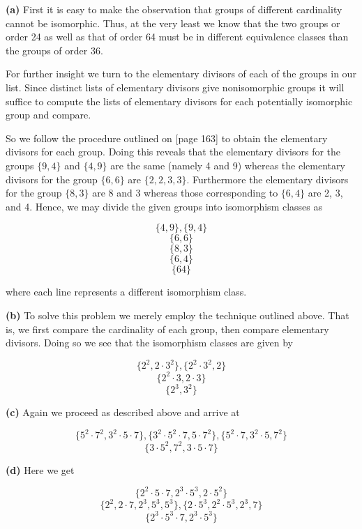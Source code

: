 \documentclass[12pt]{article}
\begin{document}
\textbf{(a)} First it is easy to make the observation that groups of different cardinality cannot be isomorphic. Thus, at the very least we know that the two groups or order 24 as well as that of order 64 must be in different equivalence classes than the groups of order 36.

For further insight we turn to the elementary divisors of each of the groups in our list. Since distinct lists of elementary divisors give nonisomorphic groups it will suffice to compute the lists of elementary divisors for each potentially isomorphic group and compare.


So we follow the procedure outlined on [page 163] to obtain the elementary divisors for each group. Doing this reveals that the elementary divisors for the groups $\{9,4\}$ and $\{4,9\}$ are the same (namely 4 and 9) whereas the elementary divisors for the group $\{6,6\}$ are $\{2,2,3,3\}$. Furthermore the elementary divisors for the group $\{8,3\}$ are 8 and 3 whereas those corresponding to $\{6,4\}$ are 2, 3, and 4. Hence, we may divide the given groups into isomorphism classes as 

\[\{4,9\}, \{9,4\}\]
\[\{6,6\}\]
\[\{8,3\}\]
\[\{6,4\}\]
\[\{64\}\]

where each line represents a different isomorphism class.

\textbf{(b)} To solve this problem we merely employ the technique outlined above. That is, we first compare the cardinality of each group, then compare elementary divisors. Doing so we see that the isomorphism classes are given by

\[\{2^2,2 \cdot 3^2\},\{2^2 \cdot 3^2, 2\}\]
\[\{2^2 \cdot 3 , 2 \cdot 3\}\]
\[\{2^3,3^2\}\]

\textbf{(c)} Again we proceed as described above and arrive at 

\[\{ 5^2 \cdot 7^2, 3^2 \cdot 5 \cdot 7 \}, \{ 3^2 \cdot 5^2 \cdot 7 , 5 \cdot 7^2 \}, \{ 5^2 \cdot 7 , 3^2 \cdot 5, 7^2 \}\]
\[\{ 3 \cdot 5^2, 7^2, 3 \cdot 5 \cdot 7 \}\]

\textbf{(d)} Here we get

\[\{ 2^2 \cdot 5 \cdot 7 , 2^3 \cdot 5^3, 2 \cdot 5^2 \}\]
\[\{ 2^2 , 2 \cdot 7, 2^3, 5^3, 5^3 \}, \{ 2 \cdot 5^3, 2^2 \cdot 5^3, 2^3, 7\}\]
\[\{ 2^3 \cdot 5^3 \cdot 7, 2^3 \cdot 5^3 \}\]
\end{document}
